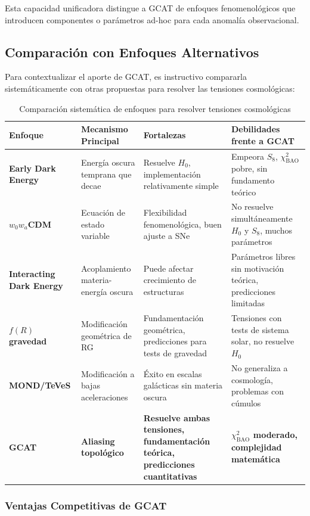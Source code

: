 \documentclass[12pt, a4paper]{article}
\theoremstyle{plain}
\theoremstyle{definition}
\begin{document}
Esta capacidad unificadora distingue a GCAT de enfoques fenomenológicos que introducen componentes o parámetros ad-hoc para cada anomalía observacional.

\subsection{Comparación con Enfoques Alternativos}

Para contextualizar el aporte de GCAT, es instructivo compararla sistemáticamente con otras propuestas para resolver las tensiones cosmológicas:

\begin{table}[h]
\centering
\caption{Comparación sistemática de enfoques para resolver tensiones cosmológicas}
\label{tab:systematic_comparison}
\begin{tabular}{p{3cm}p{3cm}p{3cm}p{3cm}}
\toprule
\textbf{Enfoque} & \textbf{Mecanismo Principal} & \textbf{Fortalezas} & \textbf{Debilidades frente a GCAT} \\
\midrule
\textbf{Early Dark Energy} & Energía oscura temprana que decae & Resuelve $H_0$, implementación relativamente simple & Empeora $S_8$, $\chi^2_{\mathrm{BAO}}$ pobre, sin fundamento teórico \\
\textbf{$w_0w_a$CDM} & Ecuación de estado variable & Flexibilidad fenomenológica, buen ajuste a SNe & No resuelve simultáneamente $H_0$ y $S_8$, muchos parámetros \\
\textbf{Interacting Dark Energy} & Acoplamiento materia-energía oscura & Puede afectar crecimiento de estructuras & Parámetros libres sin motivación teórica, predicciones limitadas \\
\textbf{$f(R)$ gravedad} & Modificación geométrica de RG & Fundamentación geométrica, predicciones para tests de gravedad & Tensiones con tests de sistema solar, no resuelve $H_0$ \\
\textbf{MOND/TeVeS} & Modificación a bajas aceleraciones & Éxito en escalas galácticas sin materia oscura & No generaliza a cosmología, problemas con cúmulos \\
\textbf{\textbf{GCAT}} & \textbf{Aliasing topológico} & \textbf{Resuelve ambas tensiones, fundamentación teórica, predicciones cuantitativas} & \textbf{$\chi^2_{\mathrm{BAO}}$ moderado, complejidad matemática} \\
\bottomrule
\end{tabular}
\end{table}

\subsubsection{Ventajas Competitivas de GCAT}
\end{document}
